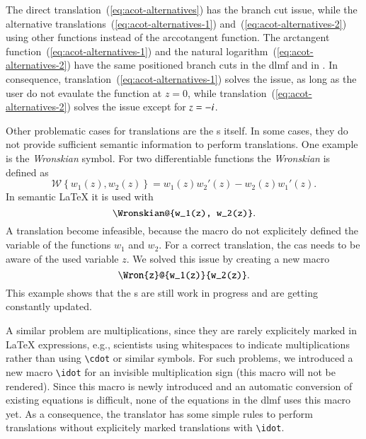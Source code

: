 The direct translation~(\ref{eq:acot-alternatives}) has the branch cut issue, while the alternative translations~(\ref{eq:acot-alternatives-1}) and~(\ref{eq:acot-alternatives-2}) using other functions instead of the arccotangent function. The arctangent function~(\ref{eq:acot-alternatives-1}) and the natural logarithm~(\ref{eq:acot-alternatives-2}) have the same positioned branch cuts in the \gls*{dlmf} and in \Maple. In consequence, translation~(\ref{eq:acot-alternatives-1}) solves the issue, as long as the user do not evaulate the function at $z = 0$, while translation~(\ref{eq:acot-alternatives-2}) solves the issue except for $z = -{i}$.

Other problematic cases for translations are the \Macro s itself. In some cases, they do not provide sufficient semantic information to perform translations. One example is the \textit{Wronskian} symbol. For two differentiable functions the \textit{Wronskian} is defined as~\parencite[eq. 1.13.4]{NIST:DLMF}
\begin{equation*}
	\mathscr{W} \left\{ w_1(z), w_2(z) \right\} = w_1(z)w_2'(z) - w_2(z)w_1'(z).
\end{equation*}
In semantic \LaTeX{} it is used with
\begin{equation}
	\verb|\Wronskian@{w_1(z), w_2(z)}|.
\end{equation}
A translation become infeasible, because the macro do not explicitely defined the variable of the functions $w_1$ and $w_2$. For a correct translation, the \gls*{cas} needs to be aware of the used variable $z$. We solved this issue by creating a new macro
\begin{equation}
	\verb|\Wron{z}@{w_1(z)}{w_2(z)}|.
\end{equation}
This example shows that the \Macro s are still work in progress and are getting constantly updated.

A similar problem are multiplications, since they are rarely explicitely marked in \LaTeX{} expressions, e.g., scientists using whitespaces to indicate multiplications rather than using \verb|\cdot| or similar symbols. For such problems, we introduced a new macro \verb|\idot| for an invisible multiplication sign (this macro will not be rendered). Since this macro is newly introduced and an automatic conversion of existing equations is difficult, none of the equations in the \gls*{dlmf} uses this macro yet. As a consequence, the translator has some simple rules to perform translations without explicitely marked translations with \verb|\idot|.

